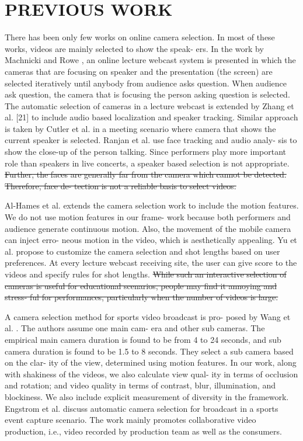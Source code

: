 \documentclass{sig-alternate}
\providecommand{\DIFadd}[1]{{\protect\color{blue}\uwave{#1}}} %
\providecommand{\DIFdel}[1]{{\protect\color{red}\sout{#1}}}                      %
\providecommand{\DIFaddbegin}{} %
\providecommand{\DIFaddend}{} %
\providecommand{\DIFdelbegin}{} %
\providecommand{\DIFdelend}{} %
\begin{document}

\section{PREVIOUS WORK}
There has been only few works on online camera selection. In
most of these works, videos are mainly selected to show the speak-
ers. In the work by Machnicki and Rowe \cite{9}, an online lecture
webcast system is presented in which the cameras that are focusing
on speaker and the presentation (the screen) are selected iteratively
until anybody from audience asks question. When audience ask
question, the camera that is focusing the person asking question is
selected. The automatic selection of cameras in a lecture webcast
is extended by Zhang et al. [21] to include audio based localization
and speaker tracking. Similar approach is taken by Cutler et al. \cite{6}
in a meeting scenario where camera that shows the current speaker
is selected. Ranjan et al. \cite{12} use face tracking and audio analy-
sis to show the close-up of the person talking. Since performers
play more important role than speakers in live concerts, a speaker
based selection is not appropriate. 
\DIFdelbegin \DIFdel{Further, the faces are generally
far from the camera which cannot be detected. Therefore, face de-
tection is not a reliable basis to select videos.
}\DIFdelend 

Al-Hames et al. \cite{3} extends the camera selection work to include
the motion features. We do not use motion features in our frame-
work because both performers and audience generate continuous
motion. Also, the movement of the mobile camera can inject erro-
neous motion in the video, which is aesthetically appealing. Yu et
al. \cite{20} propose to customize the camera selection and shot lengths
based on user preferences. At every lecture webcast receiving site,
the user can give score to the videos and specify rules for shot
lengths. \DIFdelbegin \DIFdel{While such an interactive selection of cameras is useful
for educational scenarios, people may find it annoying and stress-
ful for performances, particularly when the number of videos is
large.
}\DIFdelend \DIFaddbegin \DIFadd{this is previous work
}\DIFaddend 

A camera selection method for sports video broadcast is pro-
posed by Wang et al. \cite{16}. The authors assume one main cam-
era and other sub cameras. The empirical main camera duration is
found to be from 4 to 24 seconds, and sub camera duration is found
to be 1.5 to 8 seconds. They select a sub camera based on the clar-
ity of the view, determined using motion features. In our work,
along with shakiness of the videos, we also calculate view qual-
ity in terms of occlusion and rotation; and video quality in terms
of contrast, blur, illumination, and blockiness. We also include
explicit measurement of diversity in the framework. Engstrom et
al. \cite{8} discuss automatic camera selection for broadcast in a sports
event capture scenario. The work mainly promotes collaborative
video production, i.e., video recorded by production team as well
as the consumers.
\end{document}
